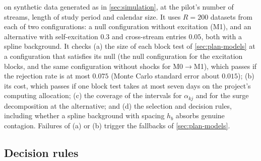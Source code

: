 \begin{enumerate}[V1.]
  on synthetic data generated as in \cref{sec:simulation}, at the pilot's number of
  streams, length of study period and calendar size. It uses $R=200$ datasets from each of
  two configurations: a null configuration without excitation (M1), and an alternative
  with self-excitation $0.3$ and cross-stream entries $0.05$, both with a spline
  background. It checks (a) the size of each block test of \cref{sec:plan-models} at a
  configuration that satisfies its null (the null configuration for the excitation blocks,
  and the same configuration without shocks for M0$\to$M1), which passes if the rejection
  rate is at most $0.075$ (Monte Carlo standard error about $0.015$); (b) its cost, which passes if one block test takes at
  most seven days on the project's computing allocation; (c) the coverage of the intervals
  for $\alpha_{kj}$ and for the surge decomposition at the alternative; and (d) the
  selection and decision rules, including whether a spline background with spacing $h_b$
  absorbs genuine contagion. Failures of (a) or (b) trigger the fallbacks of
  \cref{sec:plan-models}.
\end{enumerate}

\subsection{Decision rules}\label{sec:plan-decisions}

